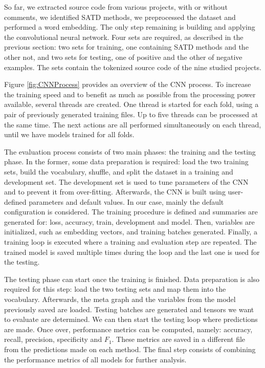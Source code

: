 So far, we extracted source code from various projects, with or without comments, we identified SATD methods, we preprocessed the dataset and performed a word embedding. The only step remaining is building and applying the convolutional neural network. Four sets are required, as described in the previous section: two sets for training, one containing SATD methods and the other not, and two sets for testing, one of positive and the other of negative examples. The sets contain the tokenized source code of the nine studied projects.

Figure \ref{fig:CNNProcess} provides an overview of the CNN process. To increase the training speed and to benefit as much as possible from the processing power available, several threads are created. One thread is started for each fold, using a pair of previously generated training files. Up to five threads can be processed at the same time. The next actions are all performed simultaneously on each thread, until we have models trained for all folds. 

The evaluation process consists of two main phases: the training and the testing phase. In the former, some data preparation is required: load the two training sets, build the vocabulary, shuffle, and split the dataset in a training and development set. The development set is used to tune parameters of the CNN and to prevent it from over-fitting. Afterwards, the CNN is built using user-defined parameters and default values. In our case, mainly the default configuration is considered. The training procedure is defined and summaries are generated for: loss, accuracy, train, development and model. Then, variables are initialized, such as embedding vectors, and training batches generated. Finally, a training loop is executed where a training and evaluation step are repeated. The trained model is saved multiple times during the loop and the last one is used for the testing. 

The testing phase can start once the training is finished. Data preparation is also required for this step: load the two testing sets and map them into the vocabulary. Afterwards, the meta graph and the variables from the model previously saved are loaded. Testing batches are generated and tensors we want to evaluate are determined. We can then start the testing loop where predictions are made. Once over, performance metrics can be computed,  namely: accuracy, recall, precision, specificity and $F_1$. These metrics are saved in a different file from the predictions made on each method. The final step consists of combining the performance metrics of all models for further analysis.

